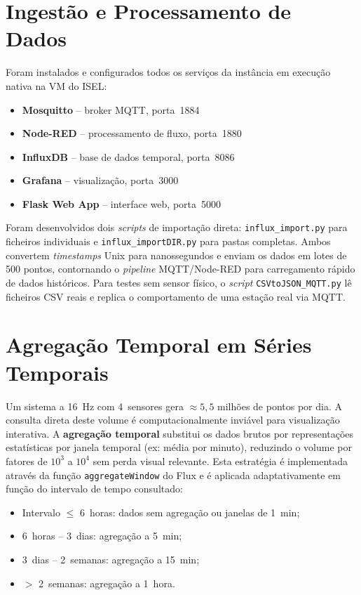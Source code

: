 \documentclass[12pt,a4paper]{report}
\begin{document}
\section{Ingestão e Processamento de Dados}
\label{sec:infra}

Foram instalados e configurados todos os serviços da instância em execução nativa na VM do ISEL:

\begin{itemize}[nosep]
  \item \textbf{Mosquitto} -- broker MQTT, porta~1884
  \item \textbf{Node-RED} -- processamento de fluxo, porta~1880
  \item \textbf{InfluxDB} -- base de dados temporal, porta~8086
  \item \textbf{Grafana} -- visualização, porta~3000
  \item \textbf{Flask Web App} -- interface web, porta~5000
\end{itemize}

Foram desenvolvidos dois \textit{scripts} de importação direta: \texttt{influx\_import.py} para ficheiros individuais e \texttt{influx\_importDIR.py} para pastas completas. Ambos convertem \textit{timestamps} Unix para nanossegundos e enviam os dados em lotes de 500 pontos, contornando o \textit{pipeline} MQTT/Node-RED para carregamento rápido de dados históricos. Para testes sem sensor físico, o \textit{script} \texttt{CSVtoJSON\_MQTT.py} lê ficheiros CSV reais e replica o comportamento de uma estação real via MQTT.

\section{Agregação Temporal em Séries Temporais}
\label{sec:agregacao}

Um sistema a 16~Hz com 4~sensores gera $\approx 5{,}5$ milhões de pontos por dia. A consulta direta deste volume é computacionalmente inviável para visualização interativa. A \textbf{agregação temporal} substitui os dados brutos por representações estatísticas por janela temporal (ex: média por minuto), reduzindo o volume por fatores de $10^3$ a $10^4$ sem perda visual relevante. Esta estratégia é implementada através da função \texttt{aggregateWindow} do Flux e é aplicada adaptativamente em função do intervalo de tempo consultado:

\begin{itemize}[nosep]
  \item Intervalo $\leq$ 6~horas: dados sem agregação ou janelas de 1~min;
  \item 6~horas -- 3~dias: agregação a 5~min;
  \item 3~dias -- 2~semanas: agregação a 15~min;
  \item $>$ 2~semanas: agregação a 1~hora.
\end{itemize}
\end{document}
